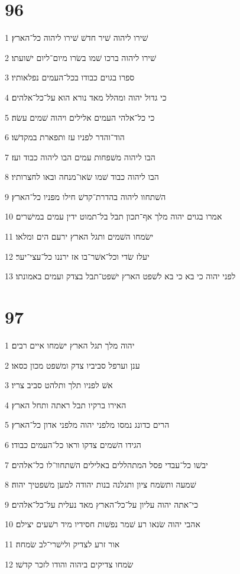 \chapter{96}

\par 1 שׁירו ליהוה שׁיר חדשׁ שׁירו ליהוה כל־הארץ׃
\par 2 שׁירו ליהוה ברכו שׁמו בשׂרו מיום־ליום ישׁועתו׃
\par 3 ספרו בגוים כבודו בכל־העמים נפלאותיו׃
\par 4 כי גדול יהוה ומהלל מאד נורא הוא על־כל־אלהים׃
\par 5 כי כל־אלהי העמים אלילים ויהוה שׁמים עשׂה׃
\par 6 הוד־והדר לפניו עז ותפארת במקדשׁו׃
\par 7 הבו ליהוה משׁפחות עמים הבו ליהוה כבוד ועז׃
\par 8 הבו ליהוה כבוד שׁמו שׂאו־מנחה ובאו לחצרותיו׃
\par 9 השׁתחוו ליהוה בהדרת־קדשׁ חילו מפניו כל־הארץ׃
\par 10 אמרו בגוים יהוה מלך אף־תכון תבל בל־תמוט ידין עמים במישׁרים׃
\par 11 ישׂמחו השׁמים ותגל הארץ ירעם הים ומלאו׃
\par 12 יעלז שׂדי וכל־אשׁר־בו אז ירננו כל־עצי־יער׃
\par 13 לפני יהוה כי בא כי בא לשׁפט הארץ ישׁפט־תבל בצדק ועמים באמונתו׃

\chapter{97}

\par 1 יהוה מלך תגל הארץ ישׂמחו איים רבים׃
\par 2 ענן וערפל סביביו צדק ומשׁפט מכון כסאו׃
\par 3 אשׁ לפניו תלך ותלהט סביב צריו׃
\par 4 האירו ברקיו תבל ראתה ותחל הארץ׃
\par 5 הרים כדונג נמסו מלפני יהוה מלפני אדון כל־הארץ׃
\par 6 הגידו השׁמים צדקו וראו כל־העמים כבודו׃
\par 7 יבשׁו כל־עבדי פסל המתהללים באלילים השׁתחוו־לו כל־אלהים׃
\par 8 שׁמעה ותשׂמח ציון ותגלנה בנות יהודה למען משׁפטיך יהוה׃
\par 9 כי־אתה יהוה עליון על־כל־הארץ מאד נעלית על־כל־אלהים׃
\par 10 אהבי יהוה שׂנאו רע שׁמר נפשׁות חסידיו מיד רשׁעים יצילם׃
\par 11 אור זרע לצדיק ולישׁרי־לב שׂמחה׃
\par 12 שׂמחו צדיקים ביהוה והודו לזכר קדשׁו׃

